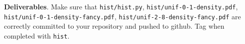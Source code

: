 \begin{fullwidth}
\begin{callout}{\bcplume}
{\bf Deliverables}. Make sure that {\tt hist/hist.py}, {\tt hist/unif-0-1-density.pdf}, {\tt hist/unif-0-1-density-fancy.pdf}, {\tt hist/unif-2-8-density-fancy.pdf} are correctly committed to your repository and pushed to github. Tag when completed with {\tt hist}.
\end{callout}
\end{fullwidth}
